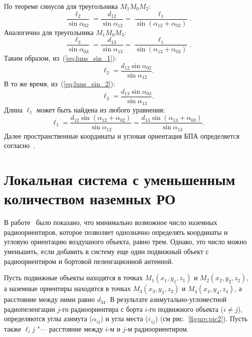 \documentclass[a4paper,12pt]{article}
\begin{document}
По теореме синусов для треугольника $M_1 M_0 M_2$:
\begin{equation}\label{eq:luns_sin_1}
    \frac{\ell_2}{\sin\alpha_{02}} = \frac{d_{12}}{\sin\alpha_{12}} = \frac{\ell_1}{\sin\left(\alpha_{12} + \alpha_{02}\right)}.
\end{equation}
Аналогично для треугольника $M_1 M_0 M_3$:
\begin{equation}\label{eq:luns_sin_2}
    \frac{\ell_3}{\sin\alpha_{03}} = \frac{d_{13}}{\sin\alpha_{13}} = \frac{\ell_1}{\sin\left(\alpha_{13} + \alpha_{03}\right)}.
\end{equation}
Таким образом, из~(\ref{eq:luns_sin_1}):
\begin{equation*}
    \ell_2 = \frac{d_{12}\sin\alpha_{02}}{\sin\alpha_{12}}.
\end{equation*}
В то же время, из~(\ref{eq:luns_sin_2}):
\begin{equation*}
    \ell_3 = \frac{d_{13}\sin\alpha_{03}}{\sin\alpha_{13}}.
\end{equation*}
Длина $\ell_1$ может быть найдена из любого уравнения:
\begin{equation*}
    \ell_1 = \frac{d_{12}\sin\left(\alpha_{12} + \alpha_{02}\right)}{\sin\alpha_{12}} = \frac{d_{13}\sin\left(\alpha_{13} + \alpha_{03}\right)}{\sin\alpha_{13}}.
\end{equation*}
Далее пространственные координаты и угловая ориентация БПА определяется согласно~\cite{antennas}.

\section{Локальная система с уменьшенным количеством наземных РО}
В работе~\cite{antennas} было показано, что минимально возможное число наземных радиоориентиров, которое позволяет
однозначно определять координаты и угловую ориентацию воздушного объекта, равно трем. Однако, это число можно уменьшить,
если добавить в систему еще один подвижный объект с радиоориентиром и бортовой пеленгационной антенной.

Пусть подвижные объекты находятся в точках $M_1\left(x_1, y_1, z_1\right)$ и $M_2\left(x_2, y_2, z_2\right)$, а
наземные ориентиры находятся в точках $M_3\left(x_3, y_3, z_3\right)$ и $M_4\left(x_4, y_4, z_4\right)$, а расстояние
между ними равно $d_{34}$. В результате азимутально-угломестной радиопеленгации  $j$-го радиоориентира с  борта
$i$-го подвижного объекта ($i \ne j$), определяются углы азимута ($\alpha_{ij}$) и угла места ($\varepsilon_{ij}$)
(см рис.~\ref{figure:pic2}). Пусть также $\ell_ij$ "--- расстояние между $i$-м и $j$-м радиоориентиром.
\end{document}
